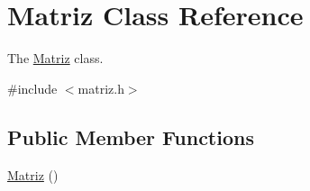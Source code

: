\hypertarget{class_matriz}{\section{Matriz Class Reference}
\label{class_matriz}
}


The \hyperlink{class_matriz}{Matriz} class.  




{\ttfamily \#include $<$matriz.\+h$>$}

\subsection*{Public Member Functions}
\begin{DoxyCompactItemize}
\item 
\hypertarget{class_matriz_a7de756301bddbc4b0b5d2a0f2b1fc695}{\hyperlink{class_matriz_a7de756301bddbc4b0b5d2a0f2b1fc695}{Matriz} ()}\label{class_matriz_a7de756301bddbc4b0b5d2a0f2b1fc695}


\end{DoxyCompactItemize}
